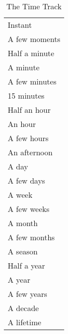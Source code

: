 
\begin{wraptable}{r}[\sidebarwidth]{3\sidebarwidth}
\centering
\begin{tabular}{l}
\toprule
Instant \\
A few moments \\
Half a minute \\
A minute \\
A few minutes \\
15 minutes \\
Half an hour \\
An hour \\
A few hours \\
An afternoon \\
A day \\
A few days \\
A week \\
A few weeks \\
A month \\
A few months \\
A season \\
Half a year \\
A year \\
A few years \\
A decade \\
A lifetime \\
\bottomrule
\end{tabular}
\caption[The Time Track]{The Time Track}
\label{tab:the-time-track}
\end{wraptable}
